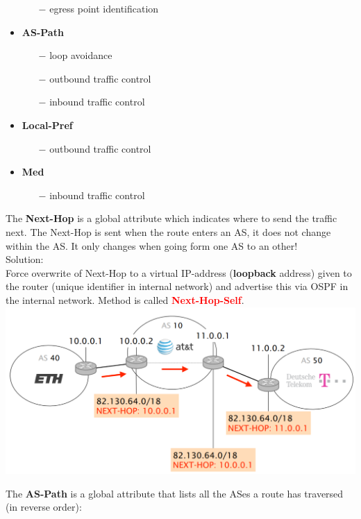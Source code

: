 \documentclass[a4paper, fontsize=8pt, landscape, DIV=1]{scrartcl}
\begin{document}
\begin{multicols*}{4}
\begin{itemize}[noitemsep]
\begin{itemize}
				\item[$-$] egress point identification
			\end{itemize}
			\item \textbf{AS-Path}
			\begin{itemize}
				\item[$-$] loop avoidance
				\item[$-$] outbound traffic control
				\item[$-$] inbound traffic control
			\end{itemize}
			\item \textbf{Local-Pref}
			\begin{itemize}
				\item[$-$] outbound traffic control
			\end{itemize}
			\item \textbf{Med}
			\begin{itemize}
				\item[$-$] inbound traffic control
			\end{itemize}
		\end{itemize}
		The \textbf{Next-Hop} is a global attribute which indicates where to send the
		traffic next. The Next-Hop is sent when the route enters an AS, it does not
		change within the AS. It only changes when going form one AS to an other!\\
		Solution:\\
		Force overwrite of Next-Hop to a virtual IP-address (\textbf{loopback}
		address) given to the router (unique identifier in internal network) and
		advertise this via OSPF in the internal network. Method is called
		\textcolor{Red}{\textbf{Next-Hop-Self}}.
		\includegraphics[width=\columnwidth]{images/Network_Layer/next_hop.png}
		\par 
		The \textbf{AS-Path} is a global attribute that lists all the ASes a route has
		traversed (in reverse order):\\

\end{multicols*}
\end{document}

